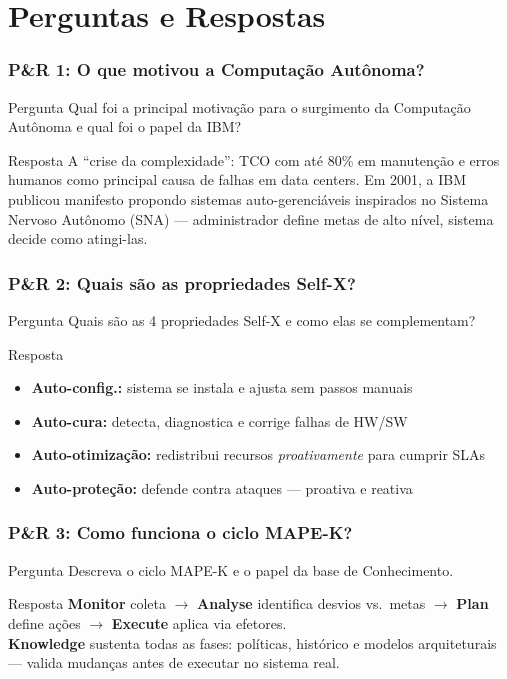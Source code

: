 \documentclass{beamer}
\begin{document}
  \section*{Perguntas e Respostas}

  \begin{frame}
    \frametitle{P\&R 1: O que motivou a Computação Autônoma?}
    \begin{alertblock}{Pergunta}
      Qual foi a principal motivação para o surgimento da Computação Autônoma e qual foi o papel da IBM?
    \end{alertblock}
    \begin{block}{Resposta}
      A ``crise da complexidade'': TCO com até 80\% em manutenção e erros humanos como principal causa de falhas em data centers. Em 2001, a IBM publicou manifesto propondo sistemas auto-gerenciáveis inspirados no Sistema Nervoso Autônomo (SNA) --- administrador define metas de alto nível, sistema decide como atingi-las.
    \end{block}
  \end{frame}

  \begin{frame}
    \frametitle{P\&R 2: Quais são as propriedades Self-X?}
    \begin{alertblock}{Pergunta}
      Quais são as 4 propriedades Self-X e como elas se complementam?
    \end{alertblock}
    \begin{block}{Resposta}
      \footnotesize
      \begin{itemize}
        \item \textbf{Auto-config.:} sistema se instala e ajusta sem passos manuais
        \item \textbf{Auto-cura:} detecta, diagnostica e corrige falhas de HW/SW
        \item \textbf{Auto-otimização:} redistribui recursos \textit{proativamente} para cumprir SLAs
        \item \textbf{Auto-proteção:} defende contra ataques --- proativa e reativa
      \end{itemize}
    \end{block}
  \end{frame}

  \begin{frame}
    \frametitle{P\&R 3: Como funciona o ciclo MAPE-K?}
    \begin{alertblock}{Pergunta}
      Descreva o ciclo MAPE-K e o papel da base de Conhecimento.
    \end{alertblock}
    \begin{block}{Resposta}
      \footnotesize
      \textbf{Monitor} coleta $\rightarrow$ \textbf{Analyse} identifica desvios vs.\ metas $\rightarrow$ \textbf{Plan} define ações $\rightarrow$ \textbf{Execute} aplica via efetores.\\[0.2cm]
      \textbf{Knowledge} sustenta todas as fases: políticas, histórico e modelos arquiteturais --- valida mudanças antes de executar no sistema real.
    \end{block}
  \end{frame}
\end{document}
